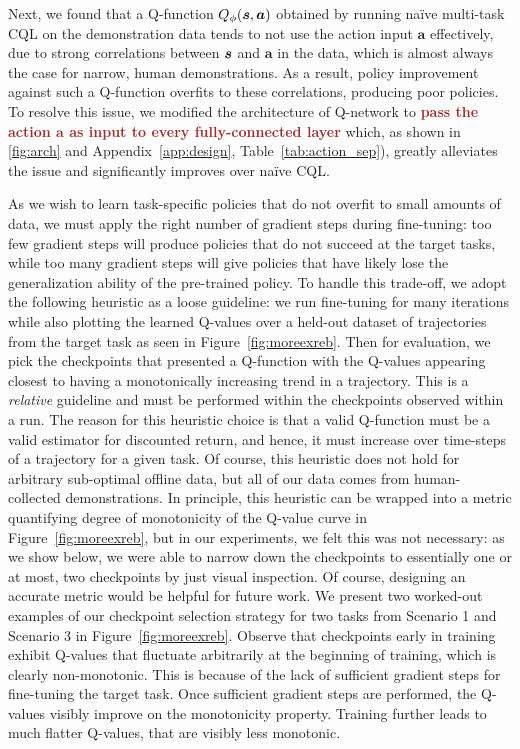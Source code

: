 Next, we found that a Q-function $Q_\phi(\boldsymbol{s}, \boldsymbol{a})$ obtained by running na\"ive multi-task CQL on the demonstration data tends to not use the action input $\mathbf{a}$ effectively, due to strong correlations between $\boldsymbol{s}$ and $\mathbf{a}$ in the data, which is almost always the case for narrow, human demonstrations. As a result, policy improvement against such a Q-function overfits to these correlations, producing poor policies. To resolve this issue, we modified the architecture of Q-network to \textcolor{brown}{\textbf{pass the action \textbf{\textit{$\mathbf{a}$}} as input to every fully-connected layer}} which, as shown in \autoref{fig:arch} and {Appendix~\ref{app:design}}, {Table~\ref{tab:action_sep}}), greatly alleviates the issue {and significantly improves over na\"ive CQL}. 



As we wish to learn task-specific policies that do not overfit to small amounts of data, we must apply the right number of gradient steps during fine-tuning: too few gradient steps will produce policies that do not succeed at the target tasks, while too many gradient steps will give policies that have likely lose the generalization ability of the pre-trained policy. {To handle this trade-off, we adopt the following heuristic as a loose guideline:} we run fine-tuning for many iterations while also plotting the learned Q-values over a held-out dataset of trajectories from the target task as seen in Figure~\ref{fig:moreexreb}. Then for evaluation, we pick the checkpoints that presented a Q-function with the Q-values appearing closest to having a monotonically increasing trend in a trajectory. This is a \emph{relative} guideline and must be performed within the checkpoints observed within a run. The reason for this heuristic choice is that a valid Q-function must be a valid estimator for discounted return, and hence, it must increase over time-steps of a trajectory for a given task.  Of course, this heuristic does not hold for arbitrary sub-optimal offline data, but all of our data comes from human-collected demonstrations. In principle, this heuristic can be wrapped into a metric quantifying degree of monotonicity of the Q-value curve in Figure~\ref{fig:moreexreb}, but in our experiments, we felt this was not necessary: as we show below, we were able to narrow down the checkpoints to essentially one or at most, two checkpoints by just visual inspection. Of course, designing an accurate metric would be helpful for future work. We present two worked-out examples of our checkpoint selection strategy for two tasks from Scenario 1 and Scenario 3 in Figure~\ref{fig:moreexreb}. Observe that checkpoints early in training exhibit Q-values that fluctuate arbitrarily at the beginning of training, which is clearly non-monotonic. This is because of the lack of sufficient gradient steps for fine-tuning the target task. Once sufficient gradient steps are performed, the Q-values visibly improve on the monotonicity property. Training further leads to much flatter Q-values, that are visibly less monotonic. 


